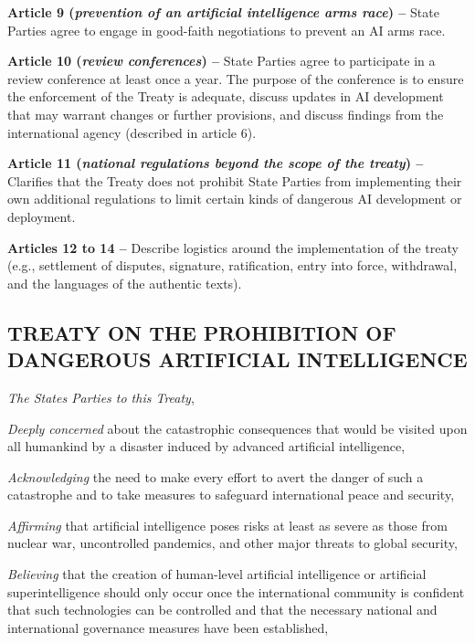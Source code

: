 \documentclass[12pt,a4paper]{article}
\begin{document}
\textbf{Article 9 (\textit{prevention of an artificial intelligence arms race}) –} State Parties agree to engage in good-faith negotiations to prevent an AI arms race.

\textbf{Article 10 (\textit{review conferences}) –} State Parties agree to participate in a review conference at least once a year. The purpose of the conference is to ensure the enforcement of the Treaty is adequate, discuss updates in AI development that may warrant changes or further provisions, and discuss findings from the international agency (described in article 6).

\textbf{Article 11 (\textit{national regulations beyond the scope of the treaty}) –} Clarifies that the Treaty does not prohibit State Parties from implementing their own additional regulations to limit certain kinds of dangerous AI development or deployment.

\textbf{Articles 12 to 14 –} Describe logistics around the implementation of the treaty (e.g., settlement of disputes, signature, ratification, entry into force, withdrawal, and the languages of the authentic texts). 

\newpage

\begin{center}

{}
\section{\textbf{TREATY ON THE PROHIBITION OF DANGEROUS ARTIFICIAL INTELLIGENCE }}
\end{center}

\textit{The States Parties to this Treaty},

\textit{Deeply concerned} about the catastrophic consequences that would be visited upon all humankind by a disaster induced by advanced artificial intelligence,

\textit{Acknowledging} the need to make every effort to avert the danger of such a catastrophe and to take measures to safeguard international peace and security,

\textit{Affirming} that artificial intelligence poses risks at least as severe as those from nuclear war, uncontrolled pandemics, and other major threats to global security,

\textit{Believing} that the creation of human-level artificial intelligence or artificial superintelligence should only occur once the international community is confident that such technologies can be controlled and that the necessary national and international governance measures have been established,
\end{document}
